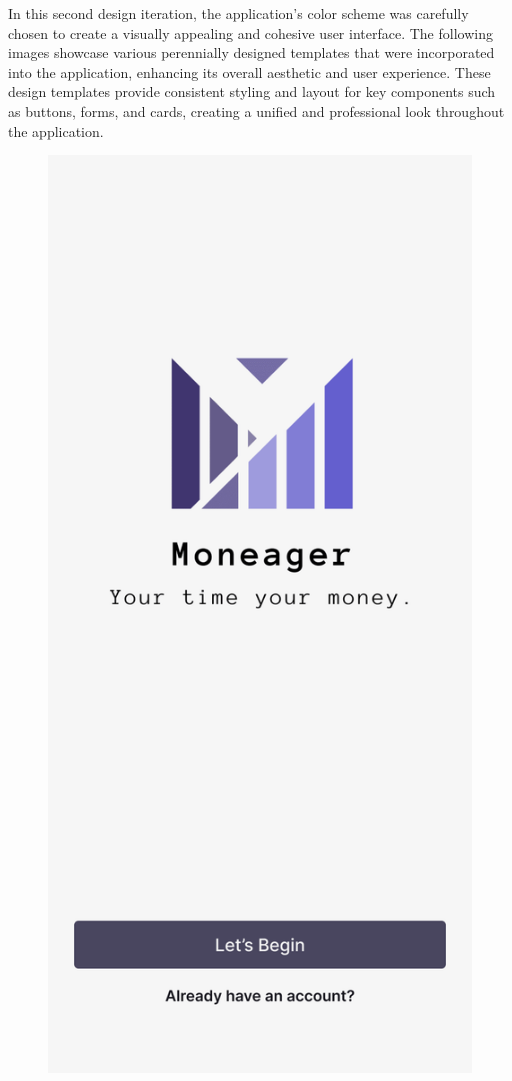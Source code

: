 In this second design iteration, the application's color scheme was carefully chosen to create a visually appealing and cohesive user interface. The following images showcase various perennially designed templates that were incorporated into the application, enhancing its overall aesthetic and user experience. These design templates provide consistent styling and layout for key components such as buttons, forms, and cards, creating a unified and professional look throughout the application. 

\begin{figure}[htbp]
  \centering
  \begin{minipage}[b]{0.23\textwidth}
    \includegraphics[width=\textwidth]{Graphics/FinalDesigns/FirstMenu.png}

\end{minipage}
\end{figure}
